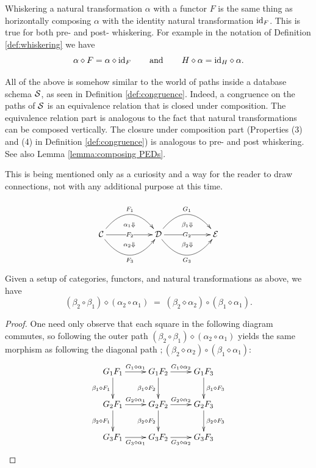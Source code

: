\documentclass[CT4S-EN-RU]{subfiles}
\begin{document}
\begin{remark}

Whiskering a natural transformation $\alpha$ with a functor $F$ is the same thing as horizontally composing $\alpha$ with the identity natural transformation $\textnormal{id}_F$. This is true for both pre- and post- whiskering. For example in the notation of Definition \ref{def:whiskering} we have 
$$\alpha\diamond F = \alpha\diamond\textnormal{id}_F\hspace{.3in}\textnormal{and}\hspace{.3in} H\diamond\alpha=\textnormal{id}_H\diamond\alpha.$$

\end{remark}

\begin{remark}

All of the above is somehow similar to the world of paths inside a database schema $\mathcal{S}$, as seen in Definition \ref{def:congruence}. Indeed, a congruence on the paths of $\mathcal{S}$ is an equivalence relation that is closed under composition. The equivalence relation part is analogous to the fact that natural transformations can be composed vertically. The closure under composition part (Properties (3) and (4) in Definition \ref{def:congruence}) is analogous to pre- and post whiskering. See also Lemma \ref{lemma:composing PEDs}. 

This is being mentioned only as a curiosity and a way for the reader to draw connections, not with any additional purpose at this time.

\end{remark}

\begin{theorem}
$$
\xymatrix{
&\ar@{}[d]|(.65){\alpha_1\Down}&&\ar@{}[d]|(.65){\beta_1\Down}\\
\mcC\ar@/^2pc/[rr]^{F_1}\ar[rr]|{F_2}\ar@/_2pc/[rr]_{F_3}&&\mcD\ar@/^2pc/[rr]^{G_1}\ar[rr]|{G_2}\ar@/_2pc/[rr]_{G_3}&&\mcE\\
&\ar@{}[u]|(.65){\alpha_2\Down}&&\ar@{}[u]|(.65){\beta_2\Down}}
$$
Given a setup of categories, functors, and natural transformations as above, we have
$$(\beta_2\circ\beta_1)\diamond(\alpha_2\circ\alpha_1)\;=\;(\beta_2\diamond\alpha_2)\circ(\beta_1\diamond\alpha_1).$$

\end{theorem}

\begin{proof}

One need only observe that each square in the following diagram commutes, so following the outer path $(\beta_2\circ\beta_1)\diamond(\alpha_2\circ\alpha_1)$ yields the same morphism as following the diagonal path $;(\beta_2\diamond\alpha_2)\circ(\beta_1\diamond\alpha_1)$:
$$
\xymatrix{
G_1F_1\ar[r]^{G_1\diamond\alpha_1}\ar[d]_{\beta_1\diamond F_1}&G_1F_2\ar[r]^{G_1\diamond\alpha_2}\ar[d]_{\beta_1\diamond F_2}&G_1F_3\ar[d]^{\beta_1\diamond F_3}\\
G_2F_1\ar[r]^{G_2\diamond\alpha_1}\ar[d]_{\beta_2\diamond F_1}&G_2F_2\ar[r]^{G_2\diamond\alpha_2}\ar[d]_{\beta_2\diamond F_2}&G_2F_3\ar[d]^{\beta_2\diamond F_3}\\
G_3F_1\ar[r]_{G_3\diamond\alpha_1}&G_3F_2\ar[r]_{G_3\diamond\alpha_2}&G_3F_3
}
$$


\end{proof}
\end{document}
